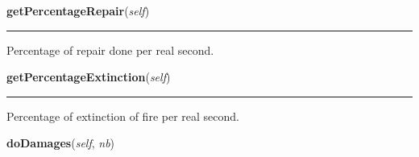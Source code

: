     \label{crewMember:CrewMember:getPercentageRepair}

    \vspace{0.5ex}

\hspace{.8\funcindent}\begin{boxedminipage}{\funcwidth}

    \raggedright \textbf{getPercentageRepair}(\textit{self})

    \vspace{-1.5ex}

    \rule{\textwidth}{0.5\fboxrule}
\setlength{\parskip}{2ex}
    Percentage of repair done per real second.

\setlength{\parskip}{1ex}
    \end{boxedminipage}

    \label{crewMember:CrewMember:getPercentageExtinction}

    \vspace{0.5ex}

\hspace{.8\funcindent}\begin{boxedminipage}{\funcwidth}

    \raggedright \textbf{getPercentageExtinction}(\textit{self})

    \vspace{-1.5ex}

    \rule{\textwidth}{0.5\fboxrule}
\setlength{\parskip}{2ex}
    Percentage of extinction of fire per real second.

\setlength{\parskip}{1ex}
    \end{boxedminipage}

    \label{crewMember:CrewMember:doDamages}

    \vspace{0.5ex}

\hspace{.8\funcindent}\begin{boxedminipage}{\funcwidth}

    \raggedright \textbf{doDamages}(\textit{self}, \textit{nb})

\setlength{\parskip}{2ex}
\setlength{\parskip}{1ex}
    \end{boxedminipage}

